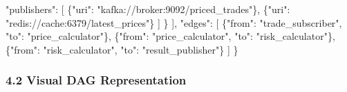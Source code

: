 \documentclass[
]{article}
\newenvironment{Shaded}{}{}
\newcommand{\DataTypeTok}[1]{\textcolor[rgb]{0.56,0.13,0.00}{#1}}
\newcommand{\FunctionTok}[1]{\textcolor[rgb]{0.02,0.16,0.49}{#1}}
\newcommand{\OtherTok}[1]{\textcolor[rgb]{0.00,0.44,0.13}{#1}}
\newcommand{\StringTok}[1]{\textcolor[rgb]{0.25,0.44,0.63}{#1}}
\begin{document}
\begin{Shaded}
\begin{Highlighting}[]
            \DataTypeTok{"publishers"}\FunctionTok{:} \OtherTok{[}
                \FunctionTok{\{}\DataTypeTok{"uri"}\FunctionTok{:} \StringTok{"kafka://broker:9092/priced\_trades"}\FunctionTok{\}}\OtherTok{,}
                \FunctionTok{\{}\DataTypeTok{"uri"}\FunctionTok{:} \StringTok{"redis://cache:6379/latest\_prices"}\FunctionTok{\}}
            \OtherTok{]}
        \FunctionTok{\}}
    \OtherTok{]}\FunctionTok{,}
    \DataTypeTok{"edges"}\FunctionTok{:} \OtherTok{[}
        \FunctionTok{\{}\DataTypeTok{"from"}\FunctionTok{:} \StringTok{"trade\_subscriber"}\FunctionTok{,} \DataTypeTok{"to"}\FunctionTok{:} \StringTok{"price\_calculator"}\FunctionTok{\}}\OtherTok{,}
        \FunctionTok{\{}\DataTypeTok{"from"}\FunctionTok{:} \StringTok{"price\_calculator"}\FunctionTok{,} \DataTypeTok{"to"}\FunctionTok{:} \StringTok{"risk\_calculator"}\FunctionTok{\}}\OtherTok{,}
        \FunctionTok{\{}\DataTypeTok{"from"}\FunctionTok{:} \StringTok{"risk\_calculator"}\FunctionTok{,} \DataTypeTok{"to"}\FunctionTok{:} \StringTok{"result\_publisher"}\FunctionTok{\}}
    \OtherTok{]}
\FunctionTok{\}}
\end{Highlighting}
\end{Shaded}

\hypertarget{visual-dag-representation}{%
\subsubsection{4.2 Visual DAG
Representation}\label{visual-dag-representation}}
\end{document}
